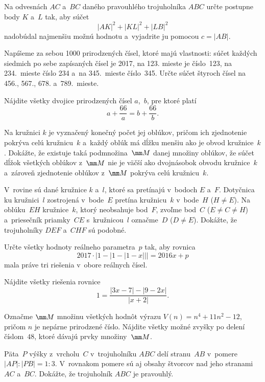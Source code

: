 {%
Na odvesnách $AC$ a~$BC$ daného pravouhlého trojuholníka $ABC$
určte postupne body $K$ a~$L$ tak, aby súčet
$$
|AK|^2+|KL|^2+|LB|^2
$$
nadobúdal najmenšiu možnú hodnotu a~vyjadrite ju pomocou $c=|AB|$.}

{%
Napíšeme za sebou 1000 prirodzených čísel, ktoré majú vlastnosti:
súčet
každých siedmich po sebe zapísaných čísel je 2017, na 123. mieste je číslo~123, na
234.~mieste číslo 234 a~na 345.~mieste číslo~345. Určte súčet štyroch čísel na
456., 567., 678. a~789.~mieste.}

{%
Nájdite všetky dvojice prirodzených čísel $a$,~$b$, pre ktoré
platí
$$
a+\frac{66}{a}=b+\frac{66}b.
$$
}

{%
Na kružnici $k$ je vyznačený konečný počet jej oblúkov, pričom ich zjednotenie pokrýva celú kružnicu~$k$ a~každý oblúk má dĺžku menšiu ako je obvod kružnice~$k$. Dokážte, že existuje taká podmnožina~$\mm M$ danej množiny oblúkov, že súčet dĺžok všetkých oblúkov z~$\mm M$ nie je väčší ako dvojnásobok obvodu kružnice~$k$ a~zároveň zjednotenie oblúkov z~$\mm M$ pokrýva celú kružnicu~$k$.
}

{%
V~rovine sú dané kružnice $k$ a~$l$, ktoré sa pretínajú v~bodoch
$E$ a~$F$. Dotyčnica ku kružnici~$l$ zostrojená v~bode~$E$ pretína kružnicu~$k$
v~bode~$H$ ($H\ne E$). Na oblúku~$EH$ kružnice~$k$, ktorý neobsahuje bod~$F$,
zvoľme bod~$C$ ($E\ne C\ne H$) a~priesečník priamky~$CE$ s~kružnicou~$l$
označme~$D$ ($D\ne E$). Dokážte, že trojuholníky $DEF$ a~$CHF$ sú podobné.}

{%
Určte všetky hodnoty reálneho parametra~$p$ tak, aby rovnica
$$
2017\cdot\Big|1-\big|1-|1-x|\big|\Big|=2016x+p
$$
mala práve tri riešenia v~obore reálnych čísel.}

{%
Nájdite všetky riešenia rovnice
$$
1=\frac{|3x-7|-|9-2x|}{|x+2|}.
$$
}

{%
Označme $\mm M$ množinu všetkých hodnôt výrazu
$V(n)=n^{4}+11n^{2}-12$,
pričom $n$ je nepárne prirodzené číslo. Nájdite všetky možné zvyšky po
delení číslom~$48$, ktoré dávajú prvky množiny~$\mm M$.}

{%
Päta~$P$ výšky z~vrcholu~$C$ v~trojuholníku $ABC$ delí stranu~$AB$
v~pomere ${|AP|:|PB|}=1:3$. V~rovnakom pomere sú aj obsahy štvorcov nad jeho stranami
$AC$ a~$BC$. Dokážte, že trojuholník $ABC$ je pravouhlý.}

